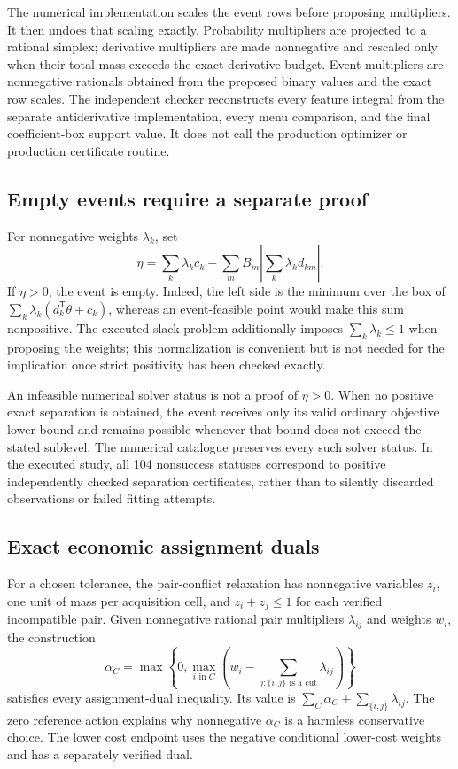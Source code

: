 The numerical implementation scales the event rows before proposing multipliers. It then undoes that scaling exactly. Probability multipliers are projected to a rational simplex; derivative multipliers are made nonnegative and rescaled only when their total mass exceeds the exact derivative budget. Event multipliers are nonnegative rationals obtained from the proposed binary values and the exact row scales. The independent checker reconstructs every feature integral from the separate antiderivative implementation, every menu comparison, and the final coefficient-box support value. It does not call the production optimizer or production certificate routine.

\subsection{Empty events require a separate proof}
For nonnegative weights $\lambda_k$, set
\[
 \eta=\sum_k\lambda_kc_k-
        \sum_mB_m\left|\sum_k\lambda_kd_{km}\right|.
\]
If $\eta>0$, the event is empty. Indeed, the left side is the minimum over the box of $\sum_k\lambda_k(d_k^{\mathsf T}\theta+c_k)$, whereas an event-feasible point would make this sum nonpositive. The executed slack problem additionally imposes $\sum_k\lambda_k\le1$ when proposing the weights; this normalization is convenient but is not needed for the implication once strict positivity has been checked exactly.

An infeasible numerical solver status is not a proof of $\eta>0$. When no positive exact separation is obtained, the event receives only its valid ordinary objective lower bound and remains possible whenever that bound does not exceed the stated sublevel. The numerical catalogue preserves every such solver status. In the executed study, all 104 nonsuccess statuses correspond to positive independently checked separation certificates, rather than to silently discarded observations or failed fitting attempts.

\subsection{Exact economic assignment duals}
For a chosen tolerance, the pair-conflict relaxation has nonnegative variables $z_i$, one unit of mass per acquisition cell, and $z_i+z_j\le1$ for each verified incompatible pair. Given nonnegative rational pair multipliers $\lambda_{ij}$ and weights $w_i$, the construction
\[
 \alpha_C=\max\left\{0,\max_{i\text{ in }C}
                   \left(w_i-\sum_{j:\{i,j\}\text{ is a cut}}\lambda_{ij}\right)\right\}
\]
satisfies every assignment-dual inequality. Its value is $\sum_C\alpha_C+\sum_{\{i,j\}}\lambda_{ij}$. The zero reference action explains why nonnegative $\alpha_C$ is a harmless conservative choice. The lower cost endpoint uses the negative conditional lower-cost weights and has a separately verified dual.

